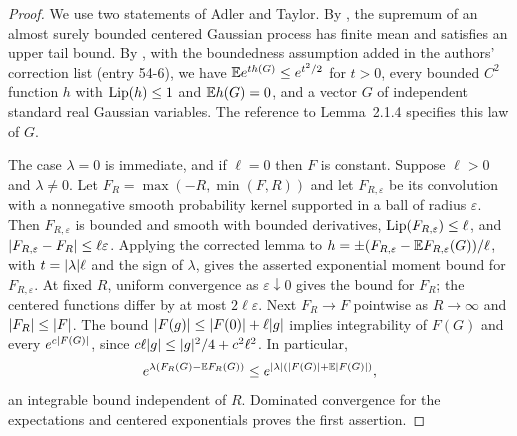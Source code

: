\begin{proof}
We use two statements of Adler and Taylor. By \cite[Theorem~2.1.1, p.~50, (2.1.5)]{AdlerTaylor2007}, the supremum of an almost surely bounded centered Gaussian process has finite mean and satisfies an upper tail bound. By \cite[Lemma~2.1.5, p.~54, (2.1.13)]{AdlerTaylor2007}, with the boundedness assumption added in the authors' correction list (entry 54-6), we have $\mathbb E e^{th(G)}\le e^{t^2/2}$ for $t>0$, every bounded $C^2$ function $h$ with $\operatorname{Lip}(h)\le1$ and $\mathbb E h(G)=0$, and a vector $G$ of independent standard real Gaussian variables. The reference to Lemma~2.1.4 specifies this law of $G$.

The case $\lambda=0$ is immediate, and if $\ell=0$ then $F$ is constant. Suppose $\ell>0$ and $\lambda\ne0$. Let $F_R=\max(-R,\min(F,R))$ and let $F_{R,\varepsilon}$ be its convolution with a nonnegative smooth probability kernel supported in a ball of radius $\varepsilon$. Then $F_{R,\varepsilon}$ is bounded and smooth with bounded derivatives, $\operatorname{Lip}(F_{R,\varepsilon})\le\ell$, and $\lvert F_{R,\varepsilon}-F_R\rvert\le\ell\varepsilon$. Applying the corrected lemma to $h=\pm(F_{R,\varepsilon}-\mathbb E F_{R,\varepsilon}(G))/\ell$, with $t=\lvert \lambda\rvert\ell$ and the sign of $\lambda$, gives the asserted exponential moment bound for $F_{R,\varepsilon}$. At fixed $R$, uniform convergence as $\varepsilon\downarrow0$ gives the bound for $F_R$; the centered functions differ by at most $2\ell\varepsilon$. Next $F_R\to F$ pointwise as $R\to\infty$ and $\lvert F_R\rvert\le\lvert F\rvert$. The bound $\lvert F(g)\rvert\le\lvert F(0)\rvert+\ell\lvert g\rvert$ implies integrability of $F(G)$ and every $e^{c\lvert F(G)\rvert}$, since $c\ell\lvert g\rvert\le\lvert g\rvert^2/4+c^2\ell^2$. In particular,
\[
 e^{\lambda(F_R(G)-\mathbb E F_R(G))}\le e^{\lvert \lambda\rvert(\lvert F(G)\rvert+\mathbb E\lvert F(G)\rvert)},
\]
an integrable bound independent of $R$. Dominated convergence for the expectations and centered exponentials proves the first assertion.


\end{proof}
